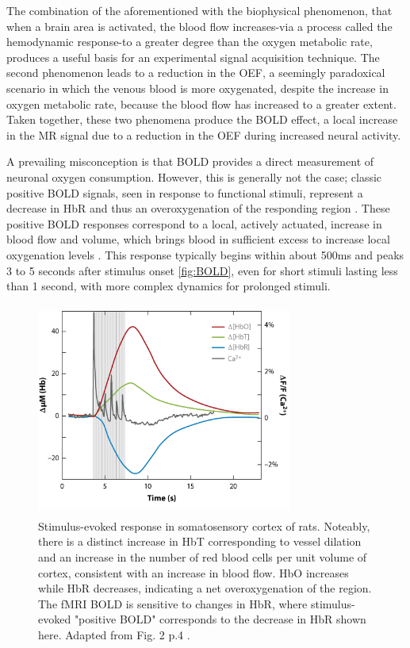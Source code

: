 The combination of the aforementioned with the biophysical phenomenon, that when a brain area is activated, the blood flow increases-via a process called the hemodynamic response-to a greater degree than the oxygen metabolic rate, produces a useful basis for an experimental signal acquisition technique. The second phenomenon leads to a reduction in the \gls{OEF}, a seemingly paradoxical scenario in which the venous blood is more oxygenated, despite the increase in oxygen metabolic rate, because the blood flow has increased to a greater extent. Taken together, these two phenomena produce the \gls{BOLD} effect, a local increase in the \gls{MR} signal due to a reduction in the \gls{OEF} during increased neural activity. \cite{Buxton2013}

A prevailing misconception is that \gls{BOLD} provides a direct measurement of neuronal oxygen consumption. However, this is generally not the case; classic positive \gls{BOLD} signals, seen in response to functional stimuli, represent a decrease in \gls{HbR} and thus an overoxygenation of the responding region \cite{Attwell2002}. These positive \gls{BOLD} responses correspond to a local, actively actuated, increase in blood flow and volume, which brings blood in sufficient excess to increase local oxygenation levels \cite{Raichle1998}. This response typically begins within about 500ms and peaks 3 to 5 seconds after stimulus onset \autoref{fig:BOLD}, even for short stimuli lasting less than 1 second, with more complex dynamics for prolonged stimuli.

\begin{figure}[htbp]
    \centering
    \includegraphics[width = 0.75\textwidth, height = 7cm]{assets/images/Hb_flactuations_BOLD.jpg}
    \caption[Stimulus-evoked response in somatosensory cortex of rats]{Stimulus-evoked response in somatosensory cortex of rats. Noteably, there is a distinct increase in \gls{HbT} corresponding to vessel dilation and an increase in the number of red blood cells per unit volume of cortex, consistent with an increase in blood flow. \gls{HbO} increases while \gls{HbR} decreases, indicating a net overoxygenation of the region. The \gls{fMRI} \gls{BOLD} is sensitive to changes in \gls{HbR}, where stimulus-evoked "positive \gls{BOLD}" corresponds to the decrease in \gls{HbR} shown here. Adapted from Fig. 2 p.4 .}
    \label{fig:BOLD}
\end{figure}

